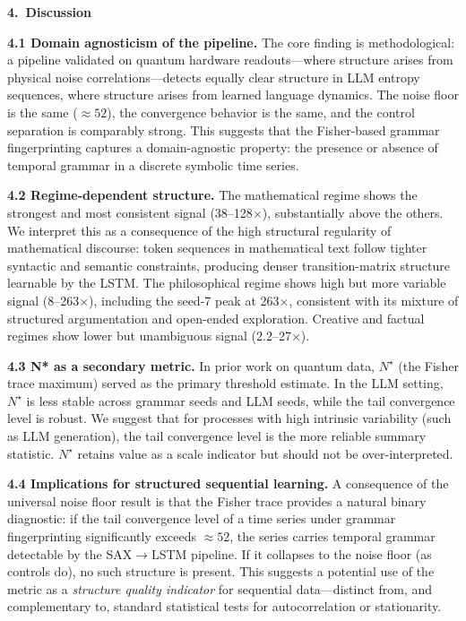 \documentclass[11pt,a4paper]{article}
\begin{document}
\vspace{0.5em}
\textbf{4.\ Discussion}

\textbf{4.1 Domain agnosticism of the pipeline.} The core finding is methodological: a pipeline validated on quantum hardware readouts---where structure arises from physical noise correlations---detects equally clear structure in LLM entropy sequences, where structure arises from learned language dynamics. The noise floor is the same ($\approx52$), the convergence behavior is the same, and the control separation is comparably strong. This suggests that the Fisher-based grammar fingerprinting captures a domain-agnostic property: the presence or absence of temporal grammar in a discrete symbolic time series.

\textbf{4.2 Regime-dependent structure.} The mathematical regime shows the strongest and most consistent signal (38--128$\times$), substantially above the others. We interpret this as a consequence of the high structural regularity of mathematical discourse: token sequences in mathematical text follow tighter syntactic and semantic constraints, producing denser transition-matrix structure learnable by the LSTM. The philosophical regime shows high but more variable signal (8--263$\times$), including the seed-7 peak at 263$\times$, consistent with its mixture of structured argumentation and open-ended exploration. Creative and factual regimes show lower but unambiguous signal (2.2--27$\times$).

\textbf{4.3 N* as a secondary metric.} In prior work on quantum data, $N^\star$ (the Fisher trace maximum) served as the primary threshold estimate. In the LLM setting, $N^\star$ is less stable across grammar seeds and LLM seeds, while the tail convergence level is robust. We suggest that for processes with high intrinsic variability (such as LLM generation), the tail convergence level is the more reliable summary statistic. $N^\star$ retains value as a scale indicator but should not be over-interpreted.

\textbf{4.4 Implications for structured sequential learning.} A consequence of the universal noise floor result is that the Fisher trace provides a natural binary diagnostic: if the tail convergence level of a time series under grammar fingerprinting significantly exceeds $\approx52$, the series carries temporal grammar detectable by the SAX$\to$LSTM pipeline. If it collapses to the noise floor (as controls do), no such structure is present. This suggests a potential use of the metric as a \emph{structure quality indicator} for sequential data---distinct from, and complementary to, standard statistical tests for autocorrelation or stationarity.
\end{document}
